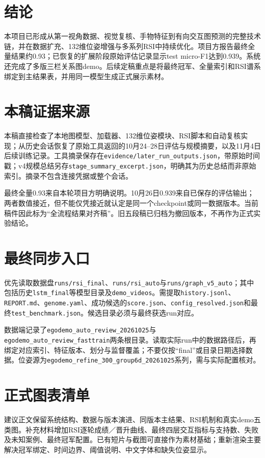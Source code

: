 \documentclass[10pt,twocolumn,letterpaper]{article}
\newcommand{\code}[1]{\texttt{\small #1}}
\begin{document}
\section{结论}
本项目已形成从第一视角数据、视觉复核、手物特征到有向交互图预测的完整技术链，并在数据扩充、132维位姿增强与多系列RSI中持续优化。项目方报告最终全量结果约0.93；已恢复的扩展阶段原始评估记录显示test micro-F1达到0.939。系统还完成了多版三栏关系图demo。后续定稿重点是将最终冠军、全量索引和RSI谱系绑定到主结果表，并用同一模型生成正式展示素材。

{\small}
\clearpage\appendix\balance
\section{本稿证据来源}
本稿直接检查了本地图模型、加载器、132维位姿模块、RSI脚本和自动复核实现；从历史会话恢复了原始工具返回的10月24--28日评估与规模摘要，以及11月4日后续训练记录。工具摘录保存在\code{evidence/later\_run\_outputs.json}，带原始时间戳；v4规模总结另存\code{stage\_summary\_excerpt.json}，明确其为历史总结而非原始索引。摘录不包含连接凭据或整个会话。

最终全量0.93来自本轮项目方明确说明。10月26日0.939来自已保存的评估输出；两者数值接近，但不能仅凭接近就认定是同一个checkpoint或同一数据版本。当前稿件因此标为“全流程结果对齐稿”。旧五段稿已归档为撤回版本，不再作为正式实验结论。

\section{最终同步入口}
优先读取数据盘\code{runs/rsi\_final}、\code{runs/rsi\_auto}与\code{runs/graph\_v5\_auto}；其中包括历史\code{lstm\_final}等模型目录及\code{demo\_videos}。需提取\code{history.jsonl}、\code{REPORT.md}、\code{genome.yaml}、成功候选的\code{score.json}、\code{config\_resolved.json}和最终\code{test\_benchmark.json}。候选目录必须与最终获选run对应。

数据端记录了\code{egodemo\_auto\_review\_20261025}与\code{egodemo\_auto\_review\_fasttrain}两条根目录。读取实际run中的数据路径后，再绑定对应索引、特征版本、划分与监督覆盖；不要仅按“final”或目录日期选择数据。位姿源为\code{egodemo\_refine\_300\_group6d\_20261025}系列，需与实际配置核对。

\section{正式图表清单}
建议正文保留系统结构、数据与版本演进、同版本主结果、RSI机制和真实demo五类图。补充材料增加RSI逐轮成绩／晋升曲线、最终四层交互指标与支持数、失败及未知案例、最终冠军配置。已有短片与截图可直接作为素材基础；重新渲染主要解决冠军绑定、时间边界、阈值说明、中文字体和缺失位姿显示。
\end{document}
